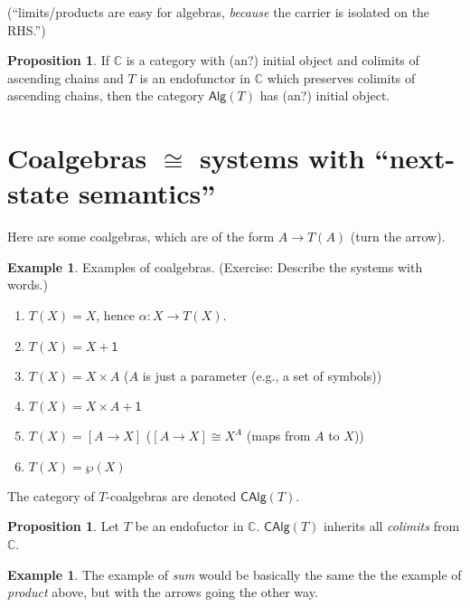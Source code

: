 \documentclass{amsart}
\theoremstyle{definition}
\newtheorem{proposition}[thm]{Proposition}
\newtheorem{example}[thm]{Example}
\begin{document}
(``limits/products are easy for algebras, \textit{because} the carrier is isolated on the RHS.'')

\begin{proposition} If $\mathbb C$ is a category with (an?) initial object and colimits of ascending chains and $T$ is an endofunctor in $\mathbb C$ which preserves colimits of ascending chains, then the category $\mathsf{Alg}(T)$ has (an?) initial object.
\end{proposition}

\section{Coalgebras $\cong$ systems with ``next-state semantics''}
Here are some coalgebras, which are of the form $A \to T(A)$ (turn the arrow). 

\begin{example} Examples of coalgebras. (Exercise: Describe the systems with words.)
\begin{enumerate}
\item $T(X) = X$, hence $\alpha : X \to T(X)$.
\item $T(X) = X + \mathsf 1$
\item $T(X) = X \times A$ ($A$ is just a parameter (e.g., a set of symbols))
\item $T(X) = X \times A + \mathsf 1$
\item $T(X) = [A \to X]$ ($[A \to X] \cong X^A$ (maps from $A$ to $X$))
\item $T(X) = \wp(X)$
\end{enumerate}
\end{example}

The category of $T$-coalgebras are denoted $\mathsf{CAlg}(T)$.

\begin{proposition} Let $T$ be an endofuctor in $\mathbb C$. $\mathsf{CAlg}(T)$ inherits all \textit{colimits} from $\mathbb C$.
\end{proposition}

\begin{example}The example of \textit{sum} would be basically the same the the example of \textit{product} above, but with the arrows going the other way.
\end{example}
\end{document}
